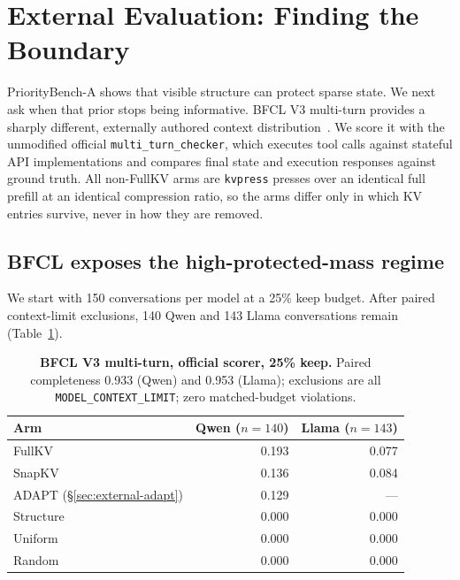 \section{External Evaluation: Finding the Boundary}
\label{sec:external}

PriorityBench-A shows that visible structure can protect sparse state.  We next
ask when that prior stops being informative.  BFCL V3 multi-turn provides a
sharply different, externally authored context distribution~\cite{patil2025bfcl}.
We score it with the unmodified official
\texttt{multi\_turn\_checker}, which executes tool calls against stateful API
implementations and compares final state and execution responses against ground
truth.  All non-FullKV arms are \texttt{kvpress} presses over an identical full
prefill at an identical compression ratio, so the arms differ only in which KV
entries survive, never in how they are removed.

\subsection{BFCL exposes the high-protected-mass regime}
\label{sec:external-transfer}

We start with 150 conversations per model at a 25\% keep budget.  After paired
context-limit exclusions, 140 Qwen and 143 Llama conversations remain
(Table~\ref{tab:external-arms}).

\begin{table}[!htbp]
  \centering
  \caption{\textbf{BFCL V3 multi-turn, official scorer, 25\% keep.}  Paired
  completeness 0.933 (Qwen) and 0.953 (Llama); exclusions are all
  \texttt{MODEL\_CONTEXT\_LIMIT}; zero matched-budget violations.}
  \label{tab:external-arms}
  \begin{tabular}{lrr}
    \toprule
    Arm & Qwen ($n{=}140$) & Llama ($n{=}143$) \\
    \midrule
    FullKV            & 0.193 & 0.077 \\
    SnapKV            & 0.136 & 0.084 \\
    ADAPT (\S\ref{sec:external-adapt}) & 0.129 & --- \\
    Structure         & 0.000 & 0.000 \\
    Uniform           & 0.000 & 0.000 \\
    Random            & 0.000 & 0.000 \\
    \bottomrule
  \end{tabular}
\end{table}

